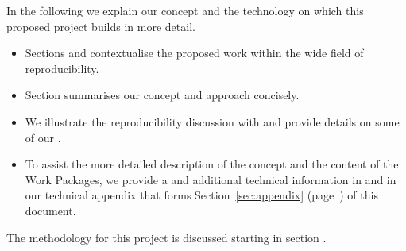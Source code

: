 In the following we explain our concept and the technology on which this
proposed project builds in more detail.
\begin{itemize}
\item Sections  and
   contextualise the proposed work
  within the wide field of reproducibility.
\item Section  summarises our concept and
  approach concisely.
\item We illustrate the reproducibility discussion with
   and provide details on some of our
  .
\item To assist the more detailed description of the concept and the content of
  the Work Packages, we provide a 
  and additional technical information in  and
   in our technical appendix that forms
  Section~\ref{sec:appendix} (page~\pageref{sec:appendix}) of this document.
\end{itemize}

\noindent The methodology for this project is discussed starting in section
.



%
%
%
%
%
%
%
%

